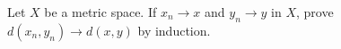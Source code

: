 Let $X$ be a metric space. If $x_n\to x$ and $y_n\to y$ in $X$, prove $d(x_n,y_n)\to d(x,y)$ by
induction.\\
